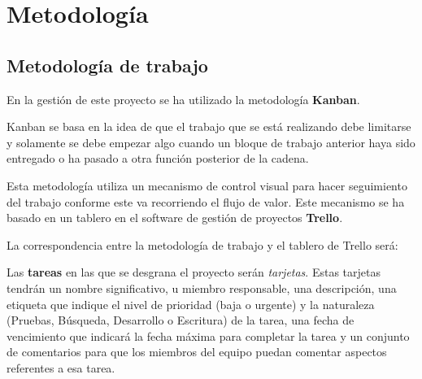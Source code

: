 \documentclass[../main.tex]{subfiles}
\begin{document}
\chapter{Metodología}\label{ch:metodologia}

\section{Metodología de trabajo}

En la gestión de este proyecto se ha utilizado la metodología \textbf{Kanban}.

Kanban se basa en la idea de que el trabajo que se está realizando debe limitarse y solamente se debe empezar algo cuando un bloque de trabajo anterior haya sido entregado o ha pasado a otra función posterior de la cadena.\cite{Ahmad2013}

Esta metodología utiliza un mecanismo de control visual para hacer seguimiento del trabajo conforme este va recorriendo el flujo de valor. Este mecanismo se ha basado en un tablero en el software de gestión de proyectos \textbf{Trello}\cite{JohnsonMLIS2017}.

La correspondencia entre la metodología de trabajo y el tablero de Trello será:

Las \textbf{tareas} en las que se desgrana el proyecto serán \textit{tarjetas}. Estas tarjetas tendrán un nombre significativo, u  miembro responsable, una descripción, una etiqueta que indique el nivel de prioridad (baja o urgente) y la naturaleza (Pruebas, Búsqueda, Desarrollo o Escritura) de la tarea, una fecha de vencimiento que indicará la fecha máxima para completar la tarea y un conjunto de comentarios para que los miembros del equipo puedan comentar aspectos referentes a esa tarea.
\end{document}
